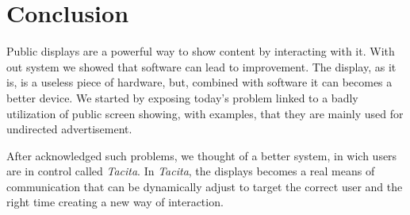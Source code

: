 \documentclass[]{usiinfbachelorproject}
\begin{document}
\section{Conclusion}
Public displays are a powerful way to show content by interacting with it. With out system we showed that software can lead to improvement. The display, as it is, is a useless piece of hardware, but, combined with software it can becomes a better device. We started by exposing today's problem linked to a badly utilization of public screen showing, with examples, that they are mainly used for undirected advertisement.

After acknowledged such problems, we thought of a better system, in wich users are in control called \emph{Tacita}. In \emph{Tacita}, the displays becomes a real means of communication that can be dynamically adjust to target the correct user and the right time creating a new way of interaction. 


\newpage


\end{document}
